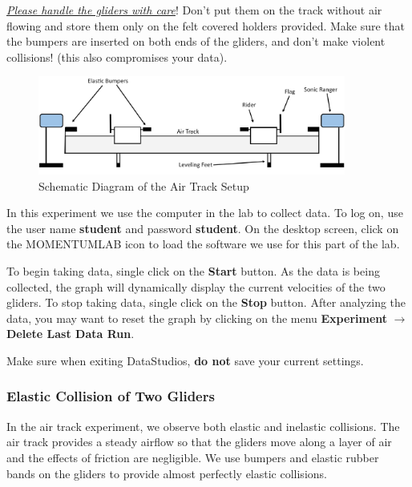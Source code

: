 \underline{\emph{Please handle the gliders with care}}! Don't put them on the track without air flowing and store them only on the felt covered holders provided. Make sure that the bumpers are inserted on both ends of the gliders, and don't make violent collisions! (this also compromises your data).\myskip

\begin{figure}[h]
\begin{center}
        \includegraphics[width=0.9\textwidth]{Exp1-6/pic/image12.jpg}
    \caption{Schematic Diagram of the Air Track Setup}
    \label{fig:airtrack_p}
\end{center}
\end{figure}

In this experiment we use the computer in the lab to collect data. To log on, use the user name \textbf{student} and password \textbf{student}. On the desktop screen, click on the MOMENTUMLAB icon to load the software we use for this part of the lab.
\myskip

To begin taking data, single click on the \textbf{Start} button. As the data is being collected, the graph will dynamically display the current velocities of the two gliders. To stop taking data, single click on the \textbf{Stop} button. After analyzing the data, you may want to reset the graph by clicking on the menu \textbf{Experiment} $\rightarrow$ \textbf{Delete Last Data Run}.
\myskip

Make sure when exiting DataStudios, {\bf{do not}} save your current settings.
\subsubsection{Elastic Collision of Two Gliders}\label{sec:elastic}

In the air track experiment, we observe both elastic and inelastic collisions. The air track provides a steady airflow so that the gliders move along a layer of air and the effects of friction are negligible. We use bumpers and elastic rubber bands on the gliders to provide almost perfectly elastic collisions.\myskip

